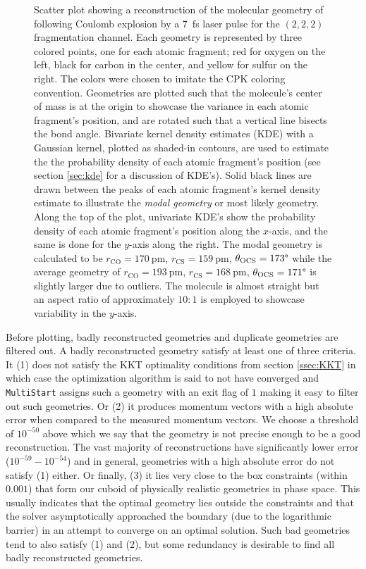 \begin{figure}
  {Scatter plot showing a reconstruction of the molecular geometry of  following Coulomb explosion by a \SI{7}{\fs} laser pulse for the $(2,2,2)$ fragmentation channel. Each geometry is represented by three colored points, one for each atomic fragment; red for oxygen on the left, black for carbon in the center, and yellow for sulfur on the right. The colors were chosen to imitate the CPK coloring convention. Geometries are plotted such that the molecule's center of mass is at the origin to showcase the variance in each atomic fragment's position, and are rotated such that a vertical line bisects the  bond angle. Bivariate kernel density estimates (KDE) with a Gaussian kernel, plotted as shaded-in contours, are used to estimate the the probability density of each atomic fragment's position (see section \ref{sec:kde} for a discussion of KDE's). Solid black lines are drawn between the peaks of each atomic fragment's kernel density estimate to illustrate the \emph{modal geometry} or most likely geometry. Along the top of the plot, univariate KDE's show the probability density of each atomic fragment's position along the $x$-axis, and the same is done for the $y$-axis along the right. The modal geometry is calculated to be $r_\mathrm{CO} = \SI{170}{\pico\m}$, $r_\mathrm{CS} = \SI{159}{\pm}$, $ \theta_\mathrm{OCS} = 173\degree$ while the average geometry of $r_\mathrm{CO} = \SI{193}{\pico\m}$, $r_\mathrm{CS} = \SI{168}{\pico\m}$, $ \theta_\mathrm{OCS} = 171\degree$ is slightly larger due to outliers. The molecule is almost straight but an aspect ratio of approximately $10:1$ is employed to showcase variability in the $y$-axis.}
  \label{fig:OCS2227fsMOGeometry}
\end{figure}

Before plotting, badly reconstructed geometries and duplicate geometries are filtered out. A badly reconstructed geometry satisfy at least one of three criteria. It (1) does not satisfy the KKT optimality conditions from section \ref{ssec:KKT} in which case the optimization algorithm is said to not have converged and \texttt{MultiStart} assigns such a geometry with an exit flag of $1$ making it easy to filter out such geometries. Or (2) it produces momentum vectors with a high absolute error when compared to the measured momentum vectors. We choose a threshold of $10^{-50}$ above which we say that the geometry is not precise enough to be a good reconstruction. The vast majority of reconstructions have significantly lower error ($10^{-59} - 10^{-54}$) and in general, geometries with a high absolute error do not satisfy (1) either. Or finally, (3) it lies very close to the box constraints (within $0.001$) that form our cuboid of physically realistic geometries in phase space. This usually indicates that the optimal geometry lies outside the constraints and that the solver asymptotically approached the boundary (due to the logarithmic barrier) in an attempt to converge on an optimal solution. Such bad geometries tend to also satisfy (1) and (2), but some redundancy is desirable to find all badly reconstructed geometries.

